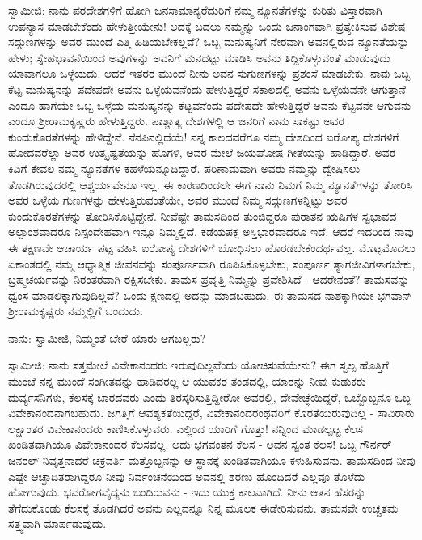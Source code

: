 ಸ್ವಾಮೀಜಿ: ನಾನು ಪರದೇಶಗಳಿಗೆ ಹೋಗಿ ಜನಸಾಮಾನ್ಯರೆದುರಿಗೆ ನಮ್ಮ ನ್ಯೂನತೆಗಳನ್ನು ಕುರಿತು ವಿಸ್ತಾರವಾಗಿ ಉಪನ್ಯಾಸ ಮಾಡಬೇಕೆಂದು ಹೇಳುತ್ತೀಯೇನು! ಅದಕ್ಕೆ ಬದಲು ನಮ್ಮನ್ನು ಒಂದು ಜನಾಂಗವಾಗಿ ಪ್ರತ್ಯೇಕಿಸುವ ವಿಶೇಷ ಸದ್ಗುಣಗಳನ್ನು ಅವರ ಮುಂದೆ ಎತ್ತಿ ಹಿಡಿಯಬೇಕಲ್ಲವೆ? ಒಬ್ಬ ಮನುಷ್ಯನಿಗೆ ನೇರವಾಗಿ ಅವನಲ್ಲಿರುವ ನ್ಯೂನತೆಯನ್ನು ಹೇಳು; ಸ್ನೇಹಭಾವನೆಯಿಂದ ಅವುಗಳನ್ನು ಅವನಿಗೆ ಮನದಟ್ಟು ಮಾಡಿಸಿ ಅವನು ತಿದ್ದಿಕೊಳ್ಳುವಂತೆ ಮಾಡುವುದು ಯಾವಾಗಲೂ ಒಳ್ಳೆಯದು. ಆದರೆ ಇತರರ ಮುಂದೆ ನೀನು ಅವನ ಸುಗುಣಗಳನ್ನು ಪ್ರಶಂಸೆ ಮಾಡಬೇಕು. ನಾವು ಒಬ್ಬ ಕೆಟ್ಟ ಮನುಷ್ಯನನ್ನು ಪದೇಪದೇ ಅವನು ಒಳ್ಳೆಯವನೆಂದು ಹೇಳುತ್ತಿದ್ದರೆ ಸಕಾಲದಲ್ಲಿ ಅವನು ಒಳ್ಳೆಯವನೇ ಆಗುತ್ತಾನೆ ಎಂದೂ ಹಾಗೆಯೇ ಒಬ್ಬ ಒಳ್ಳೆಯ ಮನುಷ್ಯನನ್ನು ಕೆಟ್ಟವನೆಂದು ಪದೇಪದೇ ಹೇಳುತ್ತಿದ್ದರೆ ಅವನು ಕೆಟ್ಟವನೇ ಆಗುವನು ಎಂದೂ ಶ‍್ರೀರಾಮಕೃಷ್ಣರು ಹೇಳುತ್ತಿದ್ದರು. ಪಾಶ್ಚಾತ್ಯ ದೇಶಗಳಲ್ಲಿ ಆ ಜನರಿಗೆ ನಾನು ಸಾಕಷ್ಟು ಅವರ ಕುಂದುಕೊರತೆಗಳನ್ನು ಹೇಳಿದ್ದೇನೆ. ನೆನಪಿನಲ್ಲಿದೆಯೆ! ನನ್ನ ಕಾಲದವರೆಗೂ ನಮ್ಮ ದೇಶದಿಂದ ಐರೋಪ್ಯ ದೇಶಗಳಿಗೆ ಹೋದವರೆಲ್ಲಾ ಅವರ ಉತ್ಕೃಷ್ಟತೆಯನ್ನು ಹೊಗಳಿ, ಅವರ ಮೇಲೆ ಜಯಘೋಷ ಗೀತೆಯನ್ನು ಹಾಡಿದ್ದಾರೆ. ಅವರ ಕಿವಿಗೆ ಕೇವಲ ನಮ್ಮ ನ್ಯೂನತೆಗಳ ಕಹಳೆಯನ್ನೂದಿದ್ದಾರೆ. ಪರಿಣಾಮವಾಗಿ ಅವರು ನಮ್ಮನ್ನು ದ್ವೇಷಿಸಲು ತೊಡಗಿರುವುದರಲ್ಲಿ ಆಶ್ಚರ್ಯವೇನೂ ಇಲ್ಲ. ಈ ಕಾರಣದಿಂದಲೇ ಈಗ ನಾನು ನಿಮಗೆ ನಿಮ್ಮ ನ್ಯೂನತೆಗಳನ್ನು ತೋರಿಸಿ ಅವರ ಒಳ್ಳೆಯ ಗುಣಗಳನ್ನು ಹೇಳುತ್ತಿರುವಂತೆಯೇ, ಅವರ ಮುಂದೆ ನಿಮ್ಮ ಸದ್ಗುಣಗಳನ್ನಿಟ್ಟು ಅವರ ಕುಂದುಕೊರತೆಗಳನ್ನು ತೋರಿಸಿಕೊಟ್ಟಿದ್ದೇನೆ. ನೀವೆಷ್ಟೇ ತಾಮಸದಿಂದ ತುಂಬಿದ್ದರೂ ಪುರಾತನ ಋಷಿಗಳ ಸ್ವಭಾವದ ಅಲ್ಪಾಂಶವಾದರೂ ನಿಸ್ಸಂದೇಹವಾಗಿ ಇನ್ನೂ ನಿಮ್ಮಲ್ಲಿದೆ. ಕಡೆಯಪಕ್ಷ ಅಸ್ತಿಭಾರವಾದರೂ ಇದೆ. ಆದರೆ ಇದರಿಂದ ನಾವು ಈ ತಕ್ಷಣವೇ ಆಚಾರ್ಯ ಪಟ್ಟ ವಹಿಸಿ ಐರೋಪ್ಯ ದೇಶಗಳಿಗೆ ಬೋಧಿಸಲು ಹೊರಡಬೇಕೆಂದರ್ಥವಲ್ಲ. ಮೊಟ್ಟಮೊದಲು ಏಕಾಂತದಲ್ಲಿ ನಮ್ಮ ಆಧ್ಯಾತ್ಮಿಕ ಜೀವನವನ್ನು ಸಂಪೂರ್ಣವಾಗಿ ರೂಪಿಸಿಕೊಳ್ಳಬೇಕು, ಸಂಪೂರ್ಣ ತ್ಯಾಗಜೀವಿಗಳಾಗಬೇಕು, ಬ್ರಹ್ಮಚರ್ಯವನ್ನು ನಿರಂತರವಾಗಿ ರಕ್ಷಿಸಬೇಕು. ತಾಮಸ ಪ್ರವೃತ್ತಿ ನಿಮ್ಮನ್ನು ಪ್ರವೇಶಿಸಿದೆ - ಆದರೇನಂತೆ? ತಾಮಸವನ್ನು ಧ್ವಂಸ ಮಾಡಲಿಕ್ಕಾಗುವುದಿಲ್ಲವೆ? ಒಂದು ಕ್ಷಣದಲ್ಲಿ ಅದನ್ನು ಮಾಡಬಹುದು. ಈ ತಾಮಸದ ನಾಶಕ್ಕಾಗಿಯೇ ಭಗವಾನ್ ಶ‍್ರೀರಾಮಕೃಷ್ಣರು ನಮ್ಮಲ್ಲಿಗೆ ಬಂದುದು.

ನಾನು: ಸ್ವಾಮೀಜಿ, ನಿಮ್ಮಂತೆ ಬೇರೆ ಯಾರು ಆಗಬಲ್ಲರು?

ಸ್ವಾಮೀಜಿ: ನಾನು ಸತ್ತಮೇಲೆ ವಿವೇಕಾನಂದರು ಇರುವುದಿಲ್ಲವೆಂದು ಯೋಚಿಸುವೆಯೇನು? ಈಗ ಸ್ವಲ್ಪ ಹೊತ್ತಿಗೆ ಮುಂಚೆ ನನ್ನ ಮುಂದೆ ಸಂಗೀತವನ್ನು ಹಾಡಿದರಲ್ಲ ಆ ಯುವಕರ ತಂಡದಲ್ಲಿ, ಯಾರನ್ನು ನೀವು ಕುಡುಕರು ದುರ್ವ್ಯಸನಿಗಳು, ಕೆಲಸಕ್ಕೆ ಬಾರದವರು ಎಂದು ತಿರಸ್ಕರಿಸುತ್ತಿದ್ದೀರೋ ಅವರಲ್ಲಿ, ದೇವೇಚ್ಛೆಯಿದ್ದರೆ, ಒಬ್ಬೊಬ್ಬನೂ ಒಬ್ಬ ವಿವೇಕಾನಂದನಾಗಬಹುದು. ಜಗತ್ತಿಗೆ ಆವಶ್ಯಕತೆಯಿದ್ದರೆ, ವಿವೇಕಾನಂದರಂಥವರಿಗೆ ಕೊರತೆಯಿರುವುದಿಲ್ಲ - ಸಾವಿರಾರು ಲಕ್ಷಾಂತರ ವಿವೇಕಾನಂದರು ಕಾಣಿಸಿಕೊಳ್ಳುವರು. ಎಲ್ಲಿಂದ ಯಾರಿಗೆ ಗೊತ್ತು! ನನ್ನಿಂದ ಮಾಡಲ್ಪಟ್ಟ ಕೆಲಸ ಖಂಡಿತವಾಗಿಯೂ ವಿವೇಕಾನಂದರ ಕೆಲಸವಲ್ಲ. ಅದು ಭಗವಂತನ ಕೆಲಸ - ಅವನ ಸ್ವಂತ ಕೆಲಸ! ಒಬ್ಬ ಗೌರ್ನರ್ ಜನರಲ್ ನಿವೃತ್ತನಾದರೆ ಚಕ್ರವರ್ತಿ ಮತ್ತೊಬ್ಬನನ್ನು ಆ ಸ್ಥಾನಕ್ಕೆ ಖಂಡಿತವಾಗಿಯೂ ಕಳುಹಿಸುವನು. ತಾಮಸದಿಂದ ನೀವು ಎಷ್ಟೇ ಆಚ್ಛಾದಿತರಾಗಿದ್ದರೂ ನೀವು ನಿರ್ವಂಚನೆಯಿಂದ ಅವನಲ್ಲಿ ಶರಣು ಹೊಂದಿದರೆ ಎಲ್ಲವೂ ತೊಳೆದು ಹೋಗುವುದು. ಭವರೋಗವೈದ್ಯನು ಬಂದಿರುವನು - ಇದು ಯುಕ್ತ ಕಾಲವಾಗಿದೆ. ನೀನು ಆತನ ಹೆಸರನ್ನು ತೆಗೆದುಕೊಂಡು ಕೆಲಸಕ್ಕೆ ತೊಡಗಿದರೆ ಅವನು ಎಲ್ಲವನ್ನೂ ನಿನ್ನ ಮೂಲಕ ಈಡೇರಿಸುವನು. ತಾಮಸವೇ ಉಚ್ಚತಮ ಸತ್ತ್ವವಾಗಿ ಮಾರ್ಪಡುವುದು.

